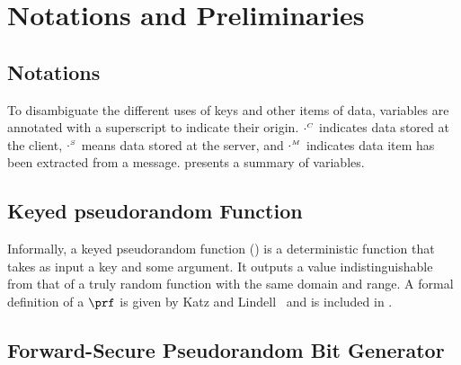 
\section{Notations and Preliminaries}

 \subsection{Notations}
  
 To disambiguate the different uses of keys and other items of data, variables are annotated with a superscript to indicate their origin. $\cdot^{\scriptscriptstyle C}$ indicates data stored at the client, $\cdot^{\scriptscriptstyle S}$ means data stored at the server, and $\cdot^{\scriptscriptstyle M}$ indicates data item has been extracted from a message.  presents  a summary of variables.
 
 

\subsection{Keyed pseudorandom Function}\label{subsec:PRF}

Informally, a keyed pseudorandom function (\prf) is a deterministic function that takes as input a key and some argument. It outputs a value indistinguishable from that of a truly random function with the same domain and range.  A formal definition of a $\prf$ is given by Katz and Lindell~\cite{KatzLindell2014} and is included in .

\subsection{Forward-Secure Pseudorandom Bit Generator}

